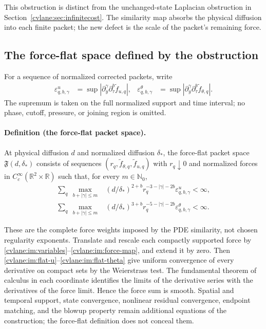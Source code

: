 This obstruction is distinct from the unchanged-state Laplacian
obstruction in Section~\ref{cvlane:sec:infinitecost}.  The similarity map
absorbs the physical diffusion into each finite packet; the new defect
is the scale of the packet's remaining force.

\subsection{The force-flat space defined by the obstruction}

For a sequence of normalized corrected packets, write
\begin{align}
 \varepsilon^u_{q,b,\gamma}
 &=\sup|\partial_y^\gamma\partial_\tau^b
                \widetilde f_{u,q}|,&
 \varepsilon^\theta_{q,b,\gamma}
 &=\sup|\partial_y^\gamma\partial_\tau^b
                \widetilde f_{\theta,q}|.
 \label{cvlane:im:normalized-budgets}
\end{align}
The supremum is taken on the full normalized support and time interval;
no phase, cutoff, pressure, or joining region is omitted.

\paragraph{Definition (the force-flat packet space).}\label{cvlane:im:force-flat-definition}
At physical diffusion $d$ and normalized diffusion $\delta_*$, the
force-flat packet space $\mathfrak F(d,\delta_*)$ consists of sequences
$(r_q,\widetilde f_{\theta,q},\widetilde f_{u,q})$ with $r_q\downarrow0$
and normalized forces in
$C_c^\infty(\mathbb R^2\times\mathbb R)$ such that, for every
$m\in\mathbb N_0$,
\begin{align}
 \sum_q\ \max_{b+|\gamma|\leq m}
 &(d/\delta_*)^{2+b}
 r_q^{-3-|\gamma|-2b}\varepsilon^u_{q,b,\gamma}<\infty,
 \label{cvlane:im:flat-u}\\
 \sum_q\ \max_{b+|\gamma|\leq m}
 &(d/\delta_*)^{3+b}
 r_q^{-5-|\gamma|-2b}\varepsilon^\theta_{q,b,\gamma}<\infty.
 \label{cvlane:im:flat-theta}
\end{align}

These are the complete force weights imposed by the PDE similarity,
not chosen regularity exponents.  Translate and rescale each compactly
supported force by \eqref{cvlane:im:variables}--\eqref{cvlane:im:force-map}, and extend
it by zero.  Then \eqref{cvlane:im:flat-u}--\eqref{cvlane:im:flat-theta} give uniform
convergence of every derivative on compact sets by the Weierstrass test.
The fundamental theorem of calculus in each coordinate identifies the
limits of the derivative series with the derivatives of the force
limit.  Hence the force sum is smooth.  Spatial and temporal support,
state convergence, nonlinear residual convergence, endpoint matching,
and the blowup property remain additional equations of the construction;
the force-flat definition does not conceal them.

